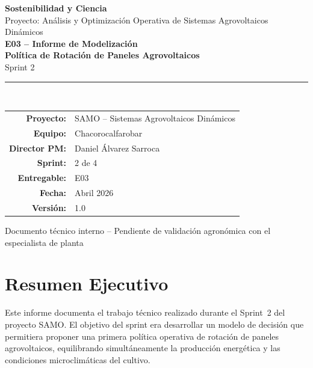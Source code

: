 \documentclass[12pt,a4paper]{article}
\begin{document}
\begin{titlepage}
    \centering
    \vspace*{1.5cm}
    {\Large \textbf{Sostenibilidad y Ciencia}}\\[0.4cm]
    {\large Proyecto: Análisis y Optimización Operativa de Sistemas Agrovoltaicos Dinámicos}\\[2.5cm]

    {\Huge \textbf{E03 -- Informe de Modelización}}\\[0.4cm]
    {\LARGE \textbf{Política de Rotación de Paneles Agrovoltaicos}}\\[0.4cm]
    {\large Sprint 2}\\[2cm]

    \rule{10cm}{0.5pt}\\[1cm]

    \begin{tabular}{rl}
        \textbf{Proyecto:}   & SAMO -- Sistemas Agrovoltaicos Dinámicos \\[4pt]
        \textbf{Equipo:}     & Chacorocalfarobar \\[4pt]
        \textbf{Director PM:}& Daniel Álvarez Sarroca \\[4pt]
        \textbf{Sprint:}     & 2 de 4 \\[4pt]
        \textbf{Entregable:} & E03 \\[4pt]
        \textbf{Fecha:}      & Abril 2026 \\[4pt]
        \textbf{Versión:}    & 1.0
    \end{tabular}

    \vfill
    {\small Documento técnico interno -- Pendiente de validación agronómica con el especialista de planta}
\end{titlepage}

\newpage
\section*{Resumen Ejecutivo}

Este informe documenta el trabajo técnico realizado durante el Sprint~2 del proyecto SAMO.
El objetivo del sprint era desarrollar un modelo de decisión que permitiera proponer una
primera política operativa de rotación de paneles agrovoltaicos, equilibrando
simultáneamente la producción energética y las condiciones microclimáticas del cultivo.
\end{document}
